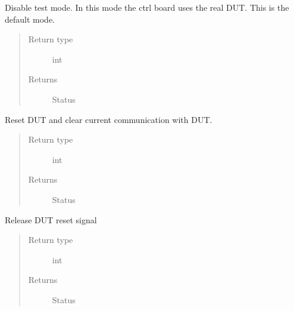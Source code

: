 \documentclass[letterpaper,10pt,english]{sphinxmanual}
\begin{document}
\begin{fulllineitems}
\begin{fulllineitems}
\label{\detokenize{reference_doc:fobos.Basys3Ctrl.disableTestMode}}
Disable test mode. In this mode the ctrl board uses the real DUT. This is the default mode.
\begin{quote}\begin{description}
\item[{Return type}] \leavevmode
int

\item[{Returns}] \leavevmode
Status

\end{description}\end{quote}

\end{fulllineitems}


\begin{fulllineitems}
\label{\detokenize{reference_doc:fobos.Basys3Ctrl.forceReset}}
Reset DUT and clear current communication with DUT.
\begin{quote}\begin{description}
\item[{Return type}] \leavevmode
int

\item[{Returns}] \leavevmode
Status

\end{description}\end{quote}

\end{fulllineitems}


\begin{fulllineitems}
\label{\detokenize{reference_doc:fobos.Basys3Ctrl.releaseReset}}
Release  DUT reset signal
\begin{quote}\begin{description}
\item[{Return type}] \leavevmode
int

\item[{Returns}] \leavevmode
Status


\end{description}
\end{quote}
\end{fulllineitems}
\end{fulllineitems}
\end{document}
